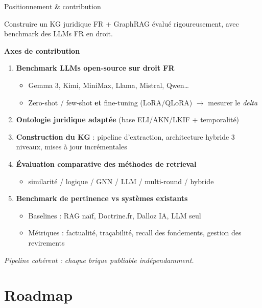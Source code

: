 \documentclass[aspectratio=169,10pt]{beamer}
\newcommand{\keybox}[1]{%
  \begin{center}
  \colorbox{accentsoft}{\parbox{0.9\linewidth}{\centering #1}}
  \end{center}}
\begin{document}
\begin{frame}{Positionnement \& contribution}
  \keybox{Construire un KG juridique FR + GraphRAG évalué rigoureusement, avec benchmark des LLMs FR en droit.}

  \vspace{0.3em}
  \textbf{Axes de contribution}
  \begin{enumerate}\footnotesize
    \item \textbf{Benchmark LLMs open-source sur droit FR}
    \begin{itemize}\scriptsize
      \item Gemma 3, Kimi, MiniMax, Llama, Mistral, Qwen\ldots
      \item Zero-shot / few-shot \textbf{et} fine-tuning (LoRA/QLoRA) $\rightarrow$ mesurer le \emph{delta}
    \end{itemize}

    \item \textbf{Ontologie juridique adaptée} (base ELI/AKN/LKIF + temporalité)

    \item \textbf{Construction du KG} : pipeline d'extraction, architecture hybride 3 niveaux, mises à jour incrémentales

    \item \textbf{Évaluation comparative des méthodes de retrieval}
    \begin{itemize}\scriptsize
      \item similarité / logique / GNN / LLM / multi-round / hybride
    \end{itemize}

    \item \textbf{Benchmark de pertinence vs systèmes existants}
    \begin{itemize}\scriptsize
      \item Baselines : RAG naïf, Doctrine.fr, Dalloz IA, LLM seul
      \item Métriques : factualité, traçabilité, recall des fondements, gestion des revirements
    \end{itemize}
  \end{enumerate}

  \vspace{0.3em}
  \footnotesize\textit{Pipeline cohérent : chaque brique publiable indépendamment.}
\end{frame}

\section{Roadmap}
\end{document}
